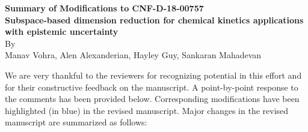 \documentclass[11pt,final]{article}
\begin{document}
\begin{center}
{\bf Summary of Modifications to CNF-D-18-00757}\\[6pt]
{\bf Subspace-based dimension reduction for chemical kinetics applications with 
epistemic uncertainty}\\[6pt]
By \\
Manav Vohra, Alen Alexanderian, Hayley Guy, Sankaran Mahadevan 
\end{center}



\vspace*{1in}


We are very thankful to the reviewers for recognizing potential in this effort
and for their constructive feedback on the manuscript. A point-by-point
response to the comments has been provided below. Corresponding modifications
have been highlighted (in blue) in the revised manuscript. Major changes in the
revised manuscript are summarized as follows:
\end{document}
